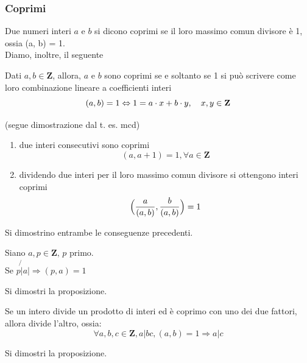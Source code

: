 \begin{flushleft}
\subsubsection{Coprimi}
Due numeri interi $a$ e $b$ si dicono coprimi se il loro massimo comun divisore è 1, ossia (a, b) = 1.\\
Diamo, inoltre, il seguente
\begin{criterio}
Dati $a, b \in \mathbf{Z}$, allora, $a$ e $b$ sono coprimi se e soltanto se 1 si può scrivere come loro combinazione lineare a coefficienti interi
\[(a, b) = 1 \Leftrightarrow 1 = a\cdot x + b \cdot y,\hspace{10px}x, y \in \mathbf{Z}\]
\end{criterio}
(segue dimostrazione dal t. es. mcd)\\
\vspace{100px}
\begin{cons}
\begin{enumerate}
    \item due interi consecutivi sono coprimi
    \[(a, a+1) = 1, \forall a\in \mathbf{Z}\]
    \item dividendo due interi per il loro massimo comun divisore si ottengono interi coprimi
    \[\Bigl(\frac{a}{(a, b)}, \frac{b}{(a, b)} \Bigr) = 1\]
\end{enumerate}
\end{cons}

\begin{esercizio}
Si dimostrino entrambe le conseguenze precedenti.
\end{esercizio}
\vspace{100px}

\begin{proposizione}
Siano $a, p \in \mathbf{Z},\,p$ primo.\\
Se $p\not{|}a|\Rightarrow (p, a) = 1$ 
\end{proposizione}
\begin{esercizio}
Si dimostri la proposizione.
\end{esercizio}
\vspace{100px}

\begin{proposizione}
Se un intero divide un prodotto di interi ed è coprimo con uno dei due fattori, allora divide l'altro, ossia:
\[\forall a,b,c \in \mathbf{Z}, a|bc, (a, b) = 1 \Rightarrow a|c\]
\end{proposizione}
\begin{esercizio}
Si dimostri la proposizione.
\end{esercizio}
\vspace{100px}


\end{flushleft}
